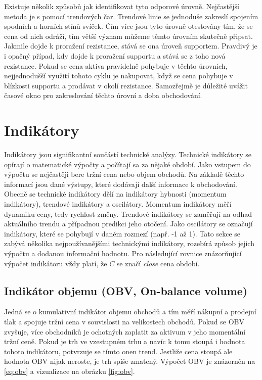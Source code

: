Existuje několik způsobů jak identifikovat tyto odporové úrovně. Nejčastější metoda je s pomocí trendových čar. Trendové linie se jednoduše zakreslí spojením spodních a horních stínů svíček.
Čím více jsou tyto úrovně otestovány tím, že se cena od nich odráží, tím větší význam můžeme těmto úrovním skutečně připsat. Jakmile dojde k proražení rezistance, stává se ona úroveň
supportem. Pravdivý je i opačný případ, kdy dojde k proražení supportu a stává se z toho nová rezistance.
Pokud se cena aktiva pravidelně pohybuje v těchto úrovních, nejjednodušší využití tohoto cyklu je nakupovat, když se cena pohybuje v blízkosti supportu a prodávat v okolí rezistance.
Samozřejmě je důležité uvážit časové okno pro zakreslování těchto úrovní a doba obchodování.


\section{Indikátory}
\label{sec:Indicators}
Indikátory jsou signifikantní součástí technické analýzy. Technické indikátory se opírají o matematické výpočty a počítají sa za nějaké období. Jako vstupem do výpočtu se nejčastěji
bere tržní cena nebo objem obchodů. Na základě těchto informací jsou dané výstupy, které dodávají další informace k obchodování.
Obecně se technické indikátory dělí na indikátory hybnosti (momentum indikátory), trendové indikátory a oscilátory. Momentum indikátory měří dynamiku ceny, tedy rychlost změny.
Trendové indikátory se zaměřují na odhad aktuálního trendu a případnou predikci jeho otočení. Jako oscilátory se označují indikátory, které se pohybují v daném rozmezí (např. -1 až 1).
Tato sekce se zabývá několika nejpoužívanějšími technickými indikátory, rozebírá způsob jejich výpočtu a dodanou informační hodnotu. Pro následující rovnice znázorňující výpočet indikátoru
vždy platí, že $C$ se značí \emph{close} cena období.

\subsection{Indikátor objemu (OBV, On-balance volume)}
Jedná se o kumulativní indikátor objemu obchodů a tím měří nákupní a prodejní tlak a spojuje tržní cena v souvislosti na velikostech obchodů. Pokud se OBV zvyšuje, více obchodníků
je ochotných zaplatit za aktivum v jeho momentální tržní ceně. Pokud je trh ve vzestupném trhu a navíc k tomu stoupá i hodnota tohoto indikátoru, potvrzuje se tímto onen trend.
Jestliže cena stoupá ale hodnota OBV nijak neroste, je trh spíše zmatený. Výpočet OBV je znázorněn na \ref{eq:obv} a vizualizace na obrázku \ref{fig:obv}.

